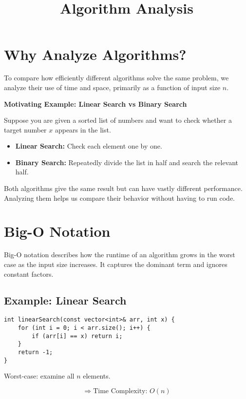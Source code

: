\documentclass{article}
\title{Algorithm Analysis}
\author{}
\date{}
\begin{document}
\maketitle



\section{Why Analyze Algorithms?}

To compare how efficiently different algorithms solve the same problem, we analyze their use of time and space, primarily as a function of input size $n$.

\textbf{Motivating Example: Linear Search vs Binary Search}

Suppose you are given a sorted list of numbers and want to check whether a target number $x$ appears in the list.

\begin{itemize}
    \item \textbf{Linear Search:} Check each element one by one.
    \item \textbf{Binary Search:} Repeatedly divide the list in half and search the relevant half.
\end{itemize}

Both algorithms give the same result but can have vastly different performance. Analyzing them helps us compare their behavior without having to run code.
\section{Big-O Notation}

Big-O notation describes how the runtime of an algorithm grows in the worst case as the input size increases. It captures the dominant term and ignores constant factors.

\subsection{Example: Linear Search}
\begin{lstlisting}[style=cppstyle]
int linearSearch(const vector<int>& arr, int x) {
    for (int i = 0; i < arr.size(); i++) {
        if (arr[i] == x) return i;
    }
    return -1;
}
\end{lstlisting}

Worst-case: examine all $n$ elements.

\[
\Rightarrow \text{Time Complexity: } O(n)
\]
\end{document}
